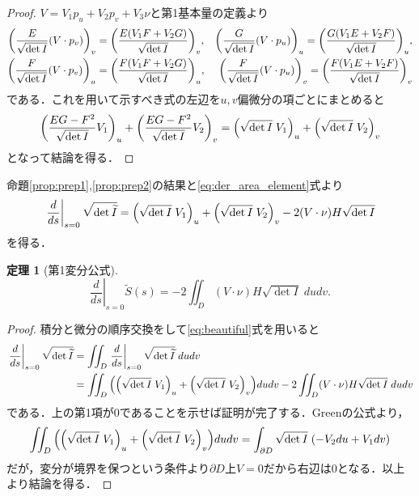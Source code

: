 \documentclass[a4j]{ltjsarticle}
\numberwithin{equation}{section}
\theoremstyle{definition}
\newtheorem{thm}{定理}[section]
\begin{document}
\begin{proof}
    $V=V_1p_u+V_2p_v+V_3\nu$と第1基本量の定義より 
    \begin{align}
        \qty(\frac{E}{\sqrt{\det I}}(V\cdot p_v))_v&=\qty(\frac{E(V_1F+V_2G)}{\sqrt{\det I}})_v,& \qty(\frac{G}{\sqrt{\det I}}(V\cdot p_u))_u=\qty(\frac{G(V_1E+V_2F)}{\sqrt{\det I}})_u,\\
        \qty(\frac{F}{\sqrt{\det I}}(V\cdot p_v))_u&=\qty(\frac{F(V_1F+V_2G)}{\sqrt{\det I}})_u,& \qty(\frac{F}{\sqrt{\det I}}(V\cdot p_u))_v=\qty(\frac{F(V_1E+V_2F)}{\sqrt{\det I}})_v
    \end{align}
    である．これを用いて示すべき式の左辺を$u,v$偏微分の項ごとにまとめると
    \begin{equation}
        \qty(\frac{EG-F^2}{\sqrt{\det I}}V_1)_u+\qty(\frac{EG-F^2}{\sqrt{\det I}}V_2)_v=\qty(\sqrt{\det I}\; V_1)_u+\qty(\sqrt{\det I}\;V_2)_v
    \end{equation}
    となって結論を得る．
\end{proof}
命題\ref{prop:prep1},\ref{prop:prep2}の結果と\eqref{eq:der_area_element}式より
\begin{equation}
    \left.\frac{d}{ds}\right|_{s=0}\sqrt{\det \widetilde{I}}=\qty(\sqrt{\det I}\; V_1)_u+\qty(\sqrt{\det I}\;V_2)_v-2(V\cdot \nu)H\sqrt{\det I}\label{eq:beautiful}
\end{equation}
を得る．
\begin{thm}[第1変分公式]\label{thm:var_formula}
    \begin{equation}
        \left.\frac{d}{ds}\right|_{s=0}\widetilde{S}(s)=-2\iint_{D}(V\cdot \nu) H\sqrt{\det I}\;dudv.
    \end{equation}
\end{thm}
\begin{proof}
    積分と微分の順序交換をして\eqref{eq:beautiful}式を用いると
    \begin{align}
        \left.\frac{d}{ds}\right|_{s=0}\sqrt{\det \widetilde{I}}&=\iint_{D}\left.\frac{d}{ds}\right|_{s=0}\sqrt{\det \widetilde{I}}\;dudv \\
        &=\iint_{D}\qty(\qty(\sqrt{\det I}\; V_1)_u+\qty(\sqrt{\det I}\;V_2)_v)dudv-2\iint_{D}(V\cdot \nu)H\sqrt{\det I}\;dudv
    \end{align}
    である．上の第1項が0であることを示せば証明が完了する．Greenの公式より，
    \begin{equation}
        \iint_{D}\qty(\qty(\sqrt{\det I}\; V_1)_u+\qty(\sqrt{\det I}\;V_2)_v)dudv=\int_{\partial D}\sqrt{\det I}\;(-V_2du+V_1dv)
    \end{equation}
    だが，変分が境界を保つという条件より$\partial D$上$V=0$だから右辺は0となる．以上より結論を得る．
\end{proof}
\end{document}
